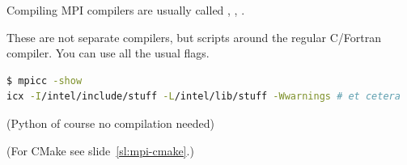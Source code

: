 
\begin{numberedframe}{Compiling}
  MPI compilers are usually called ,
  , .

  These are not separate compilers,
  but scripts around the regular C/Fortran compiler. You can use all
  the usual flags.
\begin{lstlisting}[language=bash,numbers=none]
$ mpicc -show
icx -I/intel/include/stuff -L/intel/lib/stuff -Wwarnings # et cetera
\end{lstlisting}
(Python of course no compilation needed)

  (For CMake see slide~\ref{sl:mpi-cmake}.)
\end{numberedframe}

